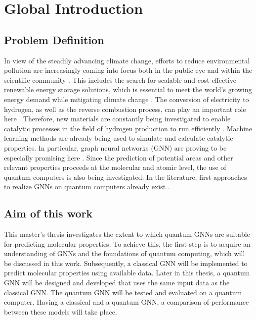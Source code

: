\chapter{Global Introduction}
\label{chap:Introduction}
\section{Problem Definition}
\label{sec:problemdefinition}
In view of the steadily advancing climate change, efforts to reduce environmental pollution are
increasingly coming into focus both in the public eye and within the scientific community \cite{amin_hydrogen_2022}.
This includes the search for scalable and cost-effective renewable energy storage solutions, which
is essential to meet the world's growing energy demand while mitigating climate change \cite{kilkis_research_2019}. The
conversion of electricity to hydrogen, as well as the reverse combustion process, can play an
important role here \cite{amin_hydrogen_2022}. Therefore, new materials are constantly being investigated to enable
catalytic processes in the field of hydrogen production to run efficiently \cite{chen_waste-derived_2023}. Machine learning
methods are already being used to simulate and calculate catalytic properties. In particular, graph
neural networks (GNN) are proving to be especially promising here \cite{tran_open_2023}. Since the prediction of
potential areas and other relevant properties proceeds at the molecular and atomic level, the use
of quantum computers is also being investigated. In the literature, first approaches to realize
GNNs on quantum computers already exist \cite{verdon_quantum_2019,beer_quantum_2021,ai_decompositional_2023}.

\section{Aim of this work}
\label{sec:aim}
This master’s thesis investigates the extent to which quantum GNNs are suitable for predicting
molecular properties. To achieve this, the first step is to acquire an understanding of GNNs and
the foundations of quantum computing, which will be discussed in this work. Subsequently, a
classical GNN will be implemented to predict molecular properties using available data. Later in
this thesis, a quantum GNN will be designed and developed that uses the same input data as the
classical GNN. The quantum GNN will be tested and evaluated on a quantum computer. Having a classical and a quantum GNN, a comparison of performance between these models will take place.

